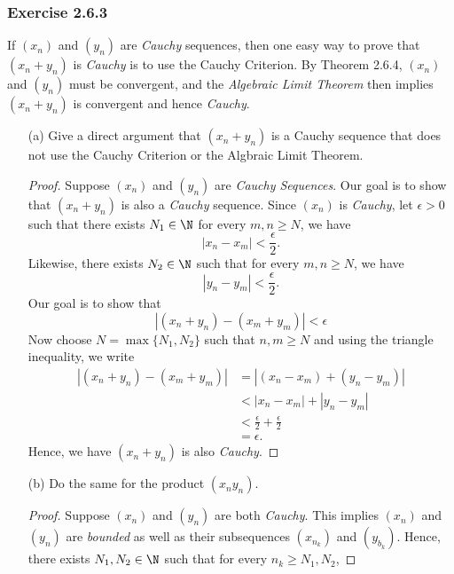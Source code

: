 \subsubsection{Exercise 2.6.3} If \((x_n)\) and \((y_n)\) are \textit{Cauchy} sequences, then one easy way to prove that \((x_n + y_n)\) is \textit{Cauchy} is to use the Cauchy Criterion. By Theorem 2.6.4, \((x_n)\) and \((y_n)\) must be convergent, and the \textit{Algebraic Limit Theorem} then implies \((x_n + y_n )\) is convergent and hence \textit{Cauchy}.
\begin{enumerate}
    \item[(a)] Give a direct argument that \((x_n + y_n)\) is a Cauchy sequence that does not use the Cauchy Criterion or the Algbraic Limit Theorem. 
        \begin{proof}
         Suppose \( (x_n)\) and \((y_n)\) are \textit{Cauchy Sequences}. Our goal is to show that \((x_n + y_n)\) is also a \textit{Cauchy} sequence. Since \( (x_n)\) is \textit{Cauchy}, let \(\epsilon > 0 \) such that there exists \( N_1 \in \N \) for every \(m,n \geq N \), we have 
         \[ |x_n - x_m | < \frac{\epsilon}{2}.\]
         Likewise, there exists \( N_2 \in \N \) such that for every \( m,n \geq N \), we have 
         \[ |y_n - y_m | < \frac{\epsilon}{2}.\]
         Our goal is to show that 
         \[ |(x_n + y_n) - (x_{m} + y_{m})| < \epsilon\]
         Now choose \( N = \max \{ N_1, N_2 \}\) such that \( n, m \geq N \) and using the triangle inequality, we write
         \begin{align*}
             |(x_n + y_n) - (x_{m} + y_{m})| &= | (x_n - x_{m}) + (y_n - y_{m})| \\
                                                 &< | x_n - x_{m}| + |y_n - y_{m}| \\
                                                 &< \frac{\epsilon}{2} + \frac{\epsilon}{2} \\
                                                 &= \epsilon.
         \end{align*}
         Hence, we have \( (x_n + y_n)\) is also \textit{Cauchy}.
        \end{proof}
    \item[(b)] Do the same for the product \((x_ny_n)\).
        \begin{proof}
            Suppose \( (x_n)\) and \((y_n)\) are both \textit{Cauchy}. This implies \((x_n)\) and \((y_n)\) are \textit{bounded} as well as their subsequences \((x_{n_k})\) and \((y_{b_k})\). Hence, there exists \(N_1, N_2 \in \N \) such that for every \(n_k \geq N_1, N_2 \), 

\end{proof}
\end{enumerate}
